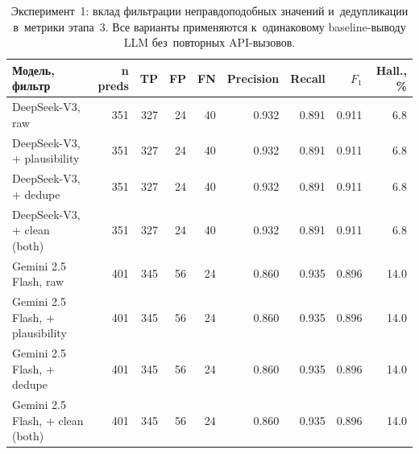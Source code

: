 \begin{table}[h]
\centering
\small
\caption{Эксперимент~1: вклад фильтрации неправдоподобных значений и~дедупликации в~метрики этапа~3. Все варианты применяются к~одинаковому baseline-выводу LLM без~повторных API-вызовов.}
\label{tab:exp_cleanup}
\begin{tabular}{@{}lrrrrrrrr@{}}
\toprule
Модель, фильтр & n preds & TP & FP & FN & Precision & Recall & $F_1$ & Hall., \% \\
\midrule
DeepSeek-V3, raw & 351 & 327 & 24 & 40 & 0.932 & 0.891 & 0.911 & 6.8 \\
DeepSeek-V3, + plausibility & 351 & 327 & 24 & 40 & 0.932 & 0.891 & 0.911 & 6.8 \\
DeepSeek-V3, + dedupe & 351 & 327 & 24 & 40 & 0.932 & 0.891 & 0.911 & 6.8 \\
DeepSeek-V3, + clean (both) & 351 & 327 & 24 & 40 & 0.932 & 0.891 & 0.911 & 6.8 \\
Gemini 2.5 Flash, raw & 401 & 345 & 56 & 24 & 0.860 & 0.935 & 0.896 & 14.0 \\
Gemini 2.5 Flash, + plausibility & 401 & 345 & 56 & 24 & 0.860 & 0.935 & 0.896 & 14.0 \\
Gemini 2.5 Flash, + dedupe & 401 & 345 & 56 & 24 & 0.860 & 0.935 & 0.896 & 14.0 \\
Gemini 2.5 Flash, + clean (both) & 401 & 345 & 56 & 24 & 0.860 & 0.935 & 0.896 & 14.0 \\
\bottomrule
\end{tabular}
\end{table}
